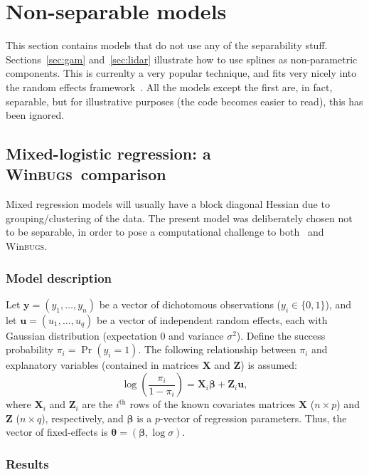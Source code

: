 \documentclass{admbmanual}
\newcommand{\scWinBUGS}{Win\textsc{bugs}}
\begin{document}
\section{Non-separable models}

This section contains models that do not use any of the separability stuff.
Sections~\ref{sec:gam} and~\ref{sec:lidar} illustrate how to use splines as
non-parametric components. This is currenlty a very popular technique, and fits
very nicely into the random effects framework~\cite{rupp:wand:carr:2003}. All
the models except the first are, in fact, separable, but for illustrative
purposes (the code becomes easier to read), this has been ignored.

\subsection{Mixed-logistic regression: a \scWinBUGS\ comparison}
\label{sec:logistic_example}

Mixed regression models will usually have a block diagonal Hessian due to
grouping/clustering of the data. The present model was deliberately chosen not
to be separable, in order to pose a computational challenge to both \scAR\ and
\scWinBUGS.

\subsubsection{Model description}

Let $\mathbf{y}=(y_1,\ldots,y_n)$ be a vector of dichotomous observations
($y_i\in\{0,1\}$), and let $\mathbf{u}=(u_1,\ldots,u_q)$ be a vector of
independent random effects, each with Gaussian distribution (expectation $0$ and
variance $\sigma^2$). Define the success probability $\pi_i=\Pr(y_i=1)$. The
following relationship between $\pi_i$ and explanatory variables (contained in
matrices $\mathbf{X}$ and $\mathbf{Z}$) is assumed:
\[
\log\left(\frac{\pi_i}{1-\pi_i}\right) = \mathbf{X}_i\mathbf{\beta} +
\mathbf{Z}_i\mathbf{u},
\]
where $\mathbf{X}_i$ and $\mathbf{Z}_i$ are the $i^{\textrm{th}}$ rows of the
known covariates matrices $\mathbf{X}$ ($n\times p$) and $\mathbf{Z}$ ($n\times
q$), respectively, and $\mathbf{\beta}$ is a $p$-vector of regression
parameters. Thus, the vector of fixed-effects is
$\mathbf{\theta}=(\mathbf{\beta},\log\sigma)$.

\subsubsection{Results}
\end{document}
